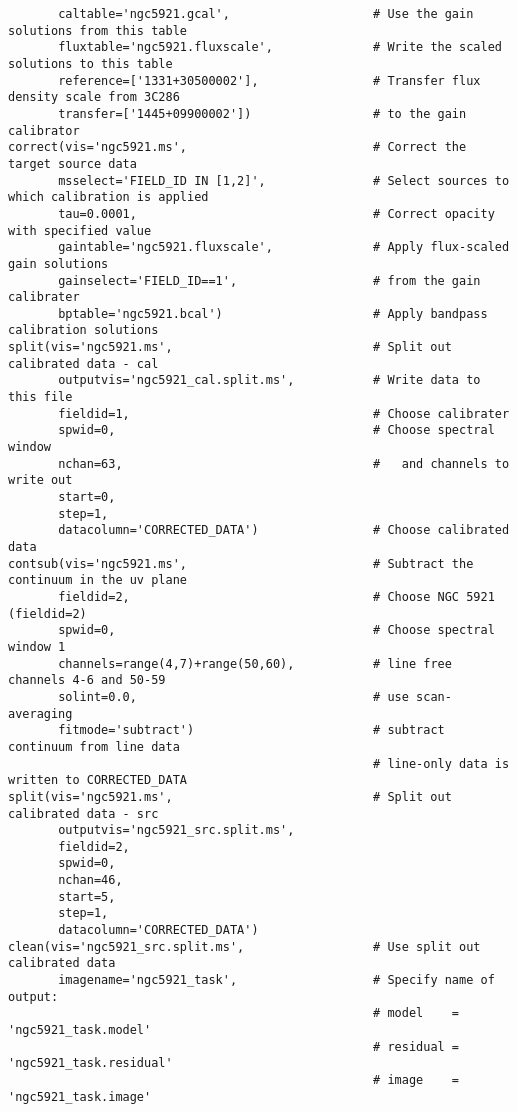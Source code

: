\begin{verbatim}
       caltable='ngc5921.gcal',                    # Use the gain solutions from this table
       fluxtable='ngc5921.fluxscale',              # Write the scaled solutions to this table
       reference=['1331+30500002'],                # Transfer flux density scale from 3C286
       transfer=['1445+09900002'])                 # to the gain calibrator
correct(vis='ngc5921.ms',                          # Correct the target source data
       msselect='FIELD_ID IN [1,2]',               # Select sources to which calibration is applied
       tau=0.0001,                                 # Correct opacity with specified value
       gaintable='ngc5921.fluxscale',              # Apply flux-scaled gain solutions
       gainselect='FIELD_ID==1',                   # from the gain calibrater
       bptable='ngc5921.bcal')                     # Apply bandpass calibration solutions
split(vis='ngc5921.ms',                            # Split out calibrated data - cal
       outputvis='ngc5921_cal.split.ms',           # Write data to this file
       fieldid=1,                                  # Choose calibrater
       spwid=0,                                    # Choose spectral window
       nchan=63,                                   #   and channels to write out
       start=0,
       step=1,
       datacolumn='CORRECTED_DATA')                # Choose calibrated data
contsub(vis='ngc5921.ms',                          # Subtract the continuum in the uv plane
       fieldid=2,                                  # Choose NGC 5921 (fieldid=2)
       spwid=0,                                    # Choose spectral window 1
       channels=range(4,7)+range(50,60),           # line free channels 4-6 and 50-59
       solint=0.0,                                 # use scan-averaging
       fitmode='subtract')                         # subtract continuum from line data
                                                   # line-only data is written to CORRECTED_DATA
split(vis='ngc5921.ms',                            # Split out calibrated data - src
       outputvis='ngc5921_src.split.ms',
       fieldid=2,
       spwid=0,
       nchan=46,
       start=5,
       step=1,
       datacolumn='CORRECTED_DATA')
clean(vis='ngc5921_src.split.ms',                  # Use split out calibrated data
       imagename='ngc5921_task',                   # Specify name of output: 
                                                   # model    = 'ngc5921_task.model'
                                                   # residual = 'ngc5921_task.residual'
                                                   # image    = 'ngc5921_task.image'

\end{verbatim}
